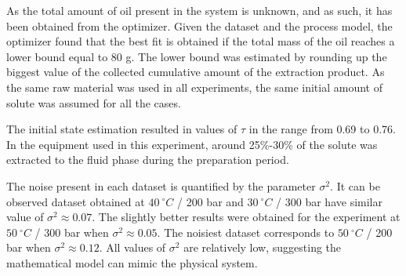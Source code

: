 \documentclass[../Article_Model_Parameters.tex]{subfiles}
\begin{document}
	
	As the total amount of oil present in the system is unknown, and as such, it has been obtained from the optimizer. Given the dataset and the process model, the optimizer found that the best fit is obtained if the total mass of the oil reaches a lower bound equal to 80 g. The lower bound was estimated by rounding up the biggest value of the collected cumulative amount of the extraction product. As the same raw material was used in all experiments, the same initial amount of solute was assumed for all the cases.
	
	The initial state estimation resulted in values of $\tau$ in the range from 0.69 to 0.76. In the equipment used in this experiment, around 25\%-30\% of the solute was extracted to the fluid phase during the preparation period.
	
	The noise present in each dataset is quantified by the parameter $\sigma^2$. It can be observed dataset obtained at $40~^\circ C$ / 200 bar and $30~^\circ C$ / 300 bar have similar value of $\sigma^2\approx0.07$. The slightly better results were obtained for the experiment at $50~^\circ C$ / 300 bar when $\sigma^2\approx0.05$. The noisiest dataset corresponds to $50~^\circ C$ / 200 bar when $\sigma^2\approx0.12$. All values of $\sigma^2$ are relatively low, suggesting the mathematical model can mimic the physical system.

		
	

	
	
\end{document}
